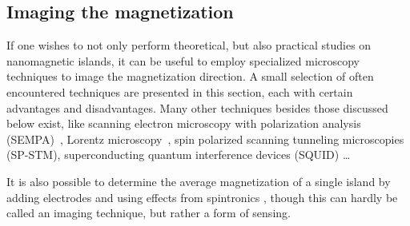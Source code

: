 \documentclass[11pt,a4paper,english,twoside]{article}
\begin{document}
\FloatBarrier
\subsection{Imaging the magnetization}
If one wishes to not only perform theoretical, but also practical studies on nanomagnetic islands, it can be useful to employ specialized microscopy techniques to image the magnetization direction. A small selection of often encountered techniques are presented in this section, each with certain advantages and disadvantages. Many other techniques besides those discussed below exist, like scanning electron microscopy with polarization analysis (SEMPA)~\cite{Imaging_SEMPA}, Lorentz microscopy~\cite{Imaging_Lorentz}, spin polarized scanning tunneling microscopies (SP-STM), superconducting quantum interference devices (SQUID) \dots \par
It is also possible to determine the average magnetization of a single island by adding electrodes and using effects from spintronics
, though this can hardly be called an imaging technique, but rather a form of sensing.
\end{document}
